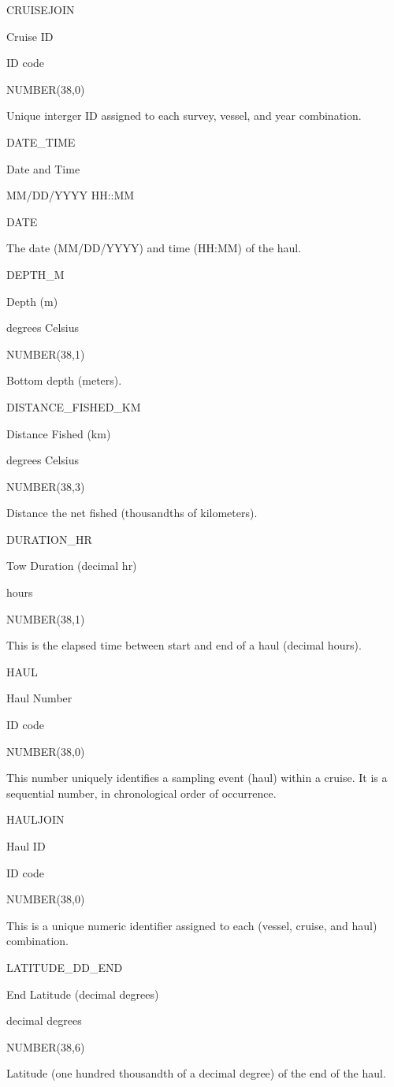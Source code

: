 \documentclass[
  letterpaper,
  oneside,
  open=any]{scrbook}
\begin{document}
CRUISEJOIN

Cruise ID

ID code

NUMBER(38,0)

Unique interger ID assigned to each survey, vessel, and year
combination.

DATE\_TIME

Date and Time

MM/DD/YYYY HH::MM

DATE

The date (MM/DD/YYYY) and time (HH:MM) of the haul.

DEPTH\_M

Depth (m)

degrees Celsius

NUMBER(38,1)

Bottom depth (meters).

DISTANCE\_FISHED\_KM

Distance Fished (km)

degrees Celsius

NUMBER(38,3)

Distance the net fished (thousandths of kilometers).

DURATION\_HR

Tow Duration (decimal hr)

hours

NUMBER(38,1)

This is the elapsed time between start and end of a haul (decimal
hours).

HAUL

Haul Number

ID code

NUMBER(38,0)

This number uniquely identifies a sampling event (haul) within a cruise.
It is a sequential number, in chronological order of occurrence.

HAULJOIN

Haul ID

ID code

NUMBER(38,0)

This is a unique numeric identifier assigned to each (vessel, cruise,
and haul) combination.

LATITUDE\_DD\_END

End Latitude (decimal degrees)

decimal degrees

NUMBER(38,6)

Latitude (one hundred thousandth of a decimal degree) of the end of the
haul.
\end{document}

